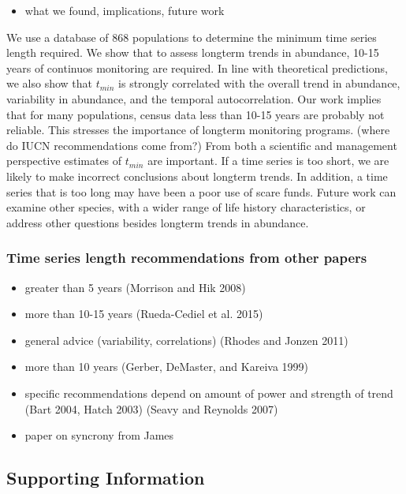 \documentclass[11pt,]{article}
\providecommand{\tightlist}{%
  \setlength{\itemsep}{0pt}\setlength{\parskip}{0pt}}
\begin{document}
\begin{itemize}
\tightlist
\item
  what we found, implications, future work
\end{itemize}

We use a database of 868 populations to determine the minimum time
series length required. We show that to assess longterm trends in
abundance, 10-15 years of continuos monitoring are required. In line
with theoretical predictions, we also show that \(t_{min}\) is strongly
correlated with the overall trend in abundance, variability in
abundance, and the temporal autocorrelation. Our work implies that for
many populations, census data less than 10-15 years are probably not
reliable. This stresses the importance of longterm monitoring programs.
(where do IUCN recommendations come from?) From both a scientific and
management perspective estimates of \(t_{min}\) are important. If a time
series is too short, we are likely to make incorrect conclusions about
longterm trends. In addition, a time series that is too long may have
been a poor use of scare funds. Future work can examine other species,
with a wider range of life history characteristics, or address other
questions besides longterm trends in abundance.

\subsubsection{Time series length recommendations from other
papers}\label{time-series-length-recommendations-from-other-papers}

\begin{itemize}
\tightlist
\item
  greater than 5 years (Morrison and Hik 2008)
\item
  more than 10-15 years (Rueda-Cediel et al. 2015)
\item
  general advice (variability, correlations) (Rhodes and Jonzen 2011)
\item
  more than 10 years (Gerber, DeMaster, and Kareiva 1999)
\item
  specific recommendations depend on amount of power and strength of
  trend (Bart 2004, Hatch 2003) (Seavy and Reynolds 2007)
\item
  paper on syncrony from James
\end{itemize}

\subsection{Supporting Information}\label{supporting-information}
\end{document}
